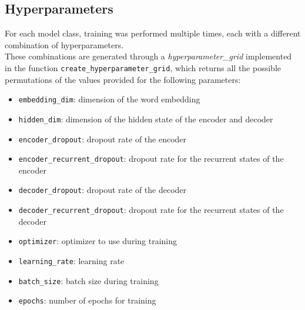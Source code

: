 \subsection{Hyperparameters}
For each model class, training was performed multiple times, each with a different combination of hyperparameters.\\
These combinations are generated through a \textit{hyperparameter\_grid}
implemented in the function \texttt{create\_hyperparameter\_grid}, which returns all the
possible permutations of the values provided for the following parameters:
\begin{itemize}
    \item \texttt{embedding\_dim}: dimension of the word embedding
    \item \texttt{hidden\_dim}: dimension of the hidden state of the encoder and decoder
    \item \texttt{encoder\_dropout}: dropout rate of the encoder
    \item \texttt{encoder\_recurrent\_dropout}: dropout rate for the recurrent states of the encoder
    \item \texttt{decoder\_dropout}: dropout rate of the decoder
    \item \texttt{decoder\_recurrent\_dropout}: dropout rate for the recurrent states of the decoder
    \item \texttt{optimizer}: optimizer to use during training
    \item \texttt{learning\_rate}: learning rate
    \item \texttt{batch\_size}: batch size during training
    \item \texttt{epochs}: number of epochs for training
\end{itemize}

